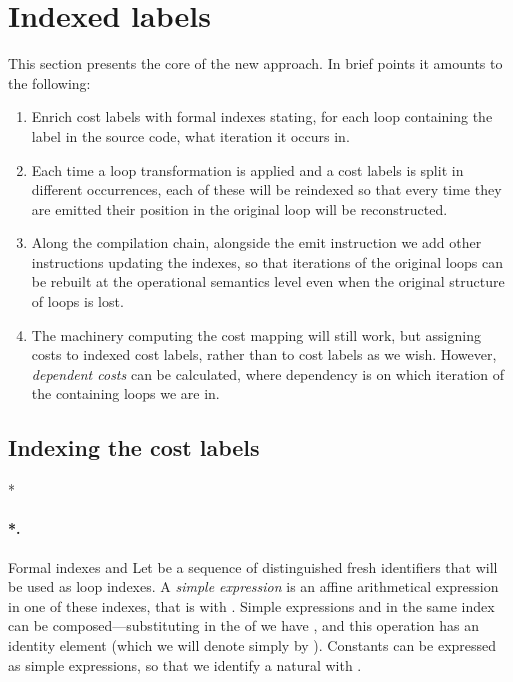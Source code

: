 \documentclass[submission,copyright,creativecommons]{eptcs}
\makeatletter
\theoremstyle{definition}
\newcommand{\s}[1]{{\sf #1}}    \newcommand{\vc}[1]{{\bf #1}}
\let\oldparagraph\paragraph
\def\paragraph{\@ifnextchar*\new@paragraph@star\new@paragraph}
\def\new@paragraph@star*#1{\oldparagraph*{#1.}}
\def\new@paragraph#1{\oldparagraph{#1.}}
\makeatother
\begin{document}
\section{Indexed labels}
\label{sec:indexedlabels}
This section presents the core of the new approach.
In brief points it amounts to the following:
\edef\ssec{ssec}
\label{ssec7}\begin{enumerate}[\bfseries\expandafter\ref\expandafter{\expandafter \ssec\arabic{enumi}}.]
\item
Enrich cost labels with formal indexes stating, for each loop containing the label
in the source code, what iteration it occurs in.
\item
Each time a loop transformation is applied and a cost labels is split in different occurrences, each of these will be reindexed so that every time they are emitted their position in the original loop will be reconstructed.
\item
Along the compilation chain, alongside the \s{emit} instruction we add other instructions updating the indexes, so that iterations of the original loops can be rebuilt at the operational semantics level
even when the original structure of loops is lost.
\item
The machinery computing the cost mapping will still work, but assigning costs to indexed cost labels, rather than to cost labels as we wish.
However, \emph{dependent costs} can be calculated, where dependency is on which iteration of the containing loops we are in.
\end{enumerate}

\subsection{Indexing the cost labels}
\label{ssec:indlabs}
\label{ssec1}

\paragraph*{Formal indexes and }
Let  be a sequence of distinguished fresh identifiers that will be used as loop indexes.
A \emph{simple expression} is an affine arithmetical expression in one of these indexes, that is  with .
\label{pag:exprcomp}Simple expressions  and  in the same index can be composed---substituting  in the  of  we have , and this operation has an identity element  (which we will denote simply by ).
Constants can be expressed as simple expressions, so that we identify a natural  with .
\end{document}
